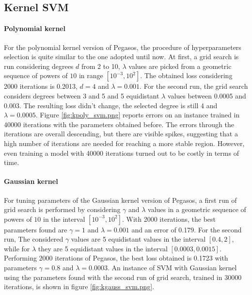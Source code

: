 \documentclass{article}
\begin{document}
\subsection{Kernel SVM}
\paragraph{Polynomial kernel}
For the polynomial kernel version of Pegasos, the procedure of hyperparameters selection is quite similar to the one adopted until now. At first, a grid search is run considering degrees $d$ from 2 to 10, $\lambda$ values are picked from a geometric sequence of powers of $10$ in range $[10^{-3}, 10^2]$. The obtained loss considering 2000 iterations is 0.2013, $d=4$ and $\lambda=0.001$. For the second run, the grid search considers degrees between 3 and 5 and 5 equidistant $\lambda$ values between 0.0005 and 0.003. The resulting loss didn't change, the selected degree is still 4 and $\lambda=0.0005$. Figure \ref{fig:kpoly_svm.png} reports errors on an instance trained in 40000 iterations with the parameters obtained before. The errors through the iterations are overall descending, but there are visible spikes, suggesting that a high number of iterations are needed for reaching a more stable region. However, even training a model with 40000 iterations turned out to be costly in terms of time.

\paragraph{Gaussian kernel}
For tuning parameters of the Gaussian kernel version of Pegasos, a first run of grid search is performed by considering $\gamma$ and $\lambda$ values in a geometric sequence of powers of $10$ in the interval $[10^{-3}, 10^2]$. With 2000 iterations, the best parameters found are $\gamma=1$ and $\lambda=0.001$ and an error of 0.179. For the second run, The considered $\gamma$ values are 5 equidistant values in the interval $[0.4, 2]$, while for $\lambda$ they are 5 equidistant values in the interval $[0.0003, 0.0015]$. Performing 2000 iterations of Pegasos, the best loss obtained is 0.1723 with parameters $\gamma=0.8$ and $\lambda=0.0003$. An instance of SVM with Gaussian kernel using the parameters found with the second run of grid search, trained in 30000 iterations, is shown in figure \ref{fig:kgauss_svm.png}.
\end{document}
